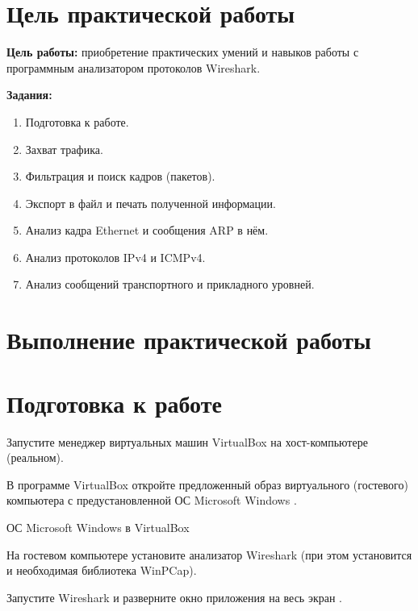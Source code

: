\section*{Цель практической работы}

\textbf{Цель работы:} приобретение практических умений
и навыков работы с программным анализатором протоколов Wireshark.

\textbf{Задания:}

\begin{enumerate}
	\item Подготовка к работе.
	\item Захват трафика.
	\item Фильтрация и поиск кадров (пакетов).
	\item Экспорт в файл и печать полученной информации.
	\item Анализ кадра Ethernet и сообщения ARP в нём.
	\item Анализ протоколов IPv4 и ICMPv4.
	\item Анализ сообщений транспортного и прикладного уровней.
\end{enumerate}

\clearpage

\section*{Выполнение практической работы}

\section{Подготовка к работе}

Запустите менеджер виртуальных машин VirtualBox
на хост-компьютере (реальном).

В программе VirtualBox откройте предложенный образ виртуального (гостевого)
компьютера с предустановленной ОС Microsoft Windows .

\begin{image}
	\caption{ОС Microsoft Windows в VirtualBox}
	\label{fig:vm:windows}
\end{image}

На гостевом компьютере установите анализатор Wireshark
(при этом установится и необходимая библиотека WinPCap).

Запустите Wireshark и разверните окно приложения на весь экран
.

